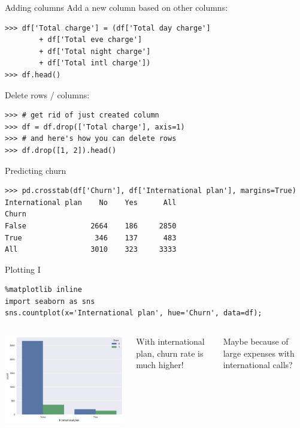 \documentclass[aspectratio=169,usenames,dvipsnames]{beamer}
\begin{document}
\begin{frame}[fragile]{Adding columns}
Add a new column based on other columns:
\begin{lstlisting}
>>> df['Total charge'] = (df['Total day charge']
        + df['Total eve charge']
        + df['Total night charge']
        + df['Total intl charge'])
>>> df.head()
\end{lstlisting}

Delete rows / columns:

\begin{lstlisting}
>>> # get rid of just created column
>>> df = df.drop(['Total charge'], axis=1)
>>> # and here's how you can delete rows
>>> df.drop([1, 2]).head()
\end{lstlisting}
\end{frame}

\begin{frame}[fragile]{Predicting churn}
\begin{lstlisting}
>>> pd.crosstab(df['Churn'], df['International plan'], margins=True)
International plan    No    Yes      All
Churn
False               2664    186     2850
True                 346    137      483
All                 3010    323     3333
\end{lstlisting}
\end{frame}

\begin{frame}[fragile]{Plotting I}
\begin{lstlisting}
%matplotlib inline
import seaborn as sns
sns.countplot(x='International plan', hue='Churn', data=df);
\end{lstlisting}
\begin{columns}
\includegraphics[height=0.6\textheight]{fig/telecomplot}

With international plan, churn rate is much higher!

\vspace{1em}
Maybe because of large expenses with international calls?
\end{columns}
\end{frame}
\end{document}
